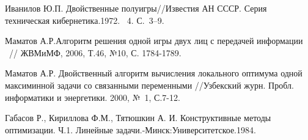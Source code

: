 


%

%

\begin{thebibliography}{9} %

 Иванилов Ю.П. Двойственные полуигры//Известия АН СССР. Серия
техническая кибернетика.1972. \textnumero~4. С.~3--9.

 Маматов А.Р.Алгоритм решения одной игры двух лиц
с передачей информации ~// ЖВМиМФ, 2006, Т.46, №10, С. 1784-1789.

 Маматов А.Р. Двойственный алгоритм вычисления локального оптимума
одной максиминной задачи со связанными переменными //Узбекский
журн. Пробл. информатики и энергетики. 2000, №~1, С.7-12.

 Габасов Р., Кириллова Ф.М., Тятюшкин А. И. Конструктивные
методы оптимизации. Ч.1. Линейные задачи.-Минск:Университетское.1984.



\end{thebibliography}





%

